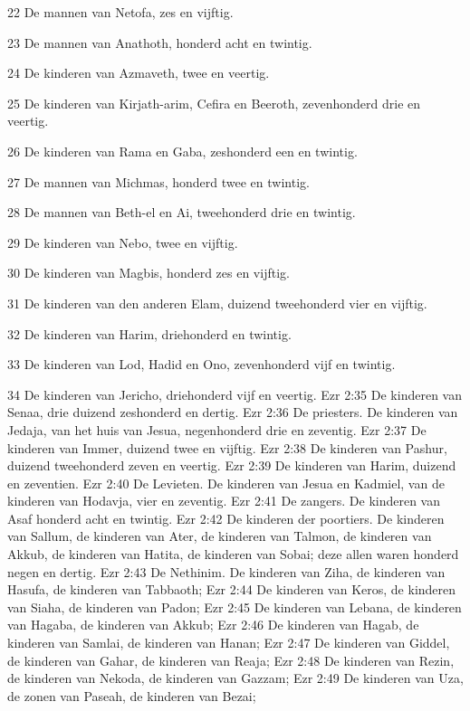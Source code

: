 \par 22 De mannen van Netofa, zes en vijftig.
\par 23 De mannen van Anathoth, honderd acht en twintig.
\par 24 De kinderen van Azmaveth, twee en veertig.
\par 25 De kinderen van Kirjath-arim, Cefira en Beeroth, zevenhonderd drie en veertig.
\par 26 De kinderen van Rama en Gaba, zeshonderd een en twintig.
\par 27 De mannen van Michmas, honderd twee en twintig.
\par 28 De mannen van Beth-el en Ai, tweehonderd drie en twintig.
\par 29 De kinderen van Nebo, twee en vijftig.
\par 30 De kinderen van Magbis, honderd zes en vijftig.
\par 31 De kinderen van den anderen Elam, duizend tweehonderd vier en vijftig.
\par 32 De kinderen van Harim, driehonderd en twintig.
\par 33 De kinderen van Lod, Hadid en Ono, zevenhonderd vijf en twintig.
\par 34 De kinderen van Jericho, driehonderd vijf en veertig.
Ezr 2:35  De kinderen van Senaa, drie duizend zeshonderd en dertig.
Ezr 2:36  De priesters. De kinderen van Jedaja, van het huis van Jesua, negenhonderd drie en zeventig.
Ezr 2:37  De kinderen van Immer, duizend twee en vijftig.
Ezr 2:38  De kinderen van Pashur, duizend tweehonderd zeven en veertig.
Ezr 2:39  De kinderen van Harim, duizend en zeventien.
Ezr 2:40  De Levieten. De kinderen van Jesua en Kadmiel, van de kinderen van Hodavja, vier en zeventig.
Ezr 2:41  De zangers. De kinderen van Asaf honderd acht en twintig.
Ezr 2:42  De kinderen der poortiers. De kinderen van Sallum, de kinderen van Ater, de kinderen van Talmon, de kinderen van Akkub, de kinderen van Hatita, de kinderen van Sobai; deze allen waren honderd negen en dertig.
Ezr 2:43  De Nethinim. De kinderen van Ziha, de kinderen van Hasufa, de kinderen van Tabbaoth;
Ezr 2:44  De kinderen van Keros, de kinderen van Siaha, de kinderen van Padon;
Ezr 2:45  De kinderen van Lebana, de kinderen van Hagaba, de kinderen van Akkub;
Ezr 2:46  De kinderen van Hagab, de kinderen van Samlai, de kinderen van Hanan;
Ezr 2:47  De kinderen van Giddel, de kinderen van Gahar, de kinderen van Reaja;
Ezr 2:48  De kinderen van Rezin, de kinderen van Nekoda, de kinderen van Gazzam;
Ezr 2:49  De kinderen van Uza, de zonen van Paseah, de kinderen van Bezai;
